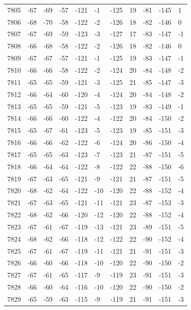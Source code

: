 \begin{table}[H]
\begin{tabular}{lllllllllll}
7805 & -67 & -69 & -57 & -121 & -1 & -125 & 19 & -81 & -145 & 1 \\
7806 & -68 & -70 & -58 & -122 & -2 & -126 & 18 & -82 & -146 & 0 \\
7807 & -67 & -69 & -59 & -123 & -3 & -127 & 17 & -83 & -147 & -1 \\
7808 & -66 & -68 & -58 & -122 & -2 & -126 & 18 & -82 & -146 & 0 \\
7809 & -67 & -67 & -57 & -121 & -1 & -125 & 19 & -83 & -147 & -1 \\
7810 & -66 & -66 & -58 & -122 & -2 & -124 & 20 & -84 & -148 & -2 \\
7811 & -65 & -65 & -59 & -121 & -3 & -125 & 21 & -85 & -147 & -3 \\
7812 & -66 & -64 & -60 & -120 & -4 & -124 & 20 & -84 & -148 & -2 \\
7813 & -65 & -65 & -59 & -121 & -5 & -123 & 19 & -83 & -149 & -1 \\
7814 & -66 & -66 & -60 & -122 & -4 & -122 & 20 & -84 & -150 & -2 \\
7815 & -65 & -67 & -61 & -123 & -5 & -123 & 19 & -85 & -151 & -3 \\
7816 & -66 & -66 & -62 & -122 & -6 & -124 & 20 & -86 & -150 & -4 \\
7817 & -65 & -65 & -63 & -123 & -7 & -123 & 21 & -87 & -151 & -5 \\
7818 & -66 & -64 & -64 & -122 & -8 & -122 & 22 & -88 & -150 & -6 \\
7819 & -67 & -63 & -65 & -121 & -9 & -121 & 21 & -87 & -151 & -5 \\
7820 & -68 & -62 & -64 & -122 & -10 & -120 & 22 & -88 & -152 & -4 \\
7821 & -67 & -63 & -65 & -121 & -11 & -121 & 23 & -87 & -153 & -3 \\
7822 & -68 & -62 & -66 & -120 & -12 & -120 & 22 & -88 & -152 & -4 \\
7823 & -67 & -61 & -67 & -119 & -13 & -121 & 23 & -89 & -151 & -5 \\
7824 & -68 & -62 & -66 & -118 & -12 & -122 & 22 & -90 & -152 & -4 \\
7825 & -67 & -61 & -67 & -119 & -11 & -121 & 21 & -91 & -151 & -3 \\
7826 & -66 & -60 & -66 & -118 & -10 & -120 & 22 & -90 & -150 & -2 \\
7827 & -67 & -61 & -65 & -117 & -9 & -119 & 23 & -91 & -151 & -3 \\
7828 & -66 & -60 & -64 & -116 & -10 & -120 & 22 & -90 & -150 & -2 \\
7829 & -65 & -59 & -63 & -115 & -9 & -119 & 21 & -91 & -151 & -3 \\

\end{tabular}
\end{table}
